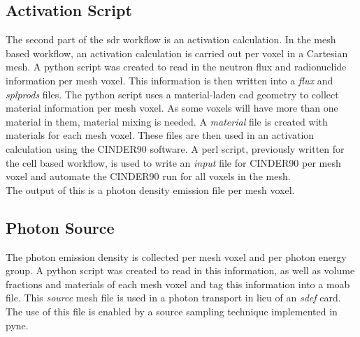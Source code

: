 \subsection{Activation Script}
The second part of the \gls{sdr} workflow is an activation calculation. In the
mesh based workflow, an activation calculation is carried out per voxel in a
Cartesian mesh.
A python script was created to read in the neutron flux and radionuclide
information per mesh voxel. This information is then written into a \emph{flux}
and \emph{splprods} files. The python script uses a material-laden
\gls{cad} geometry to collect material information per mesh voxel. As some
voxels will have more than one material in them, material mixing is needed. A
\emph{material} file is created with materials for each mesh voxel.
These files are then used in an activation calculation using the CINDER90
software. A perl script, previously written for the cell based workflow, is
used to write an \emph{input} file for CINDER90 per mesh voxel and automate
the CINDER90 run for all voxels in the mesh.\\
The output of this is a photon density emission file per mesh voxel.
\subsection{Photon Source}
The photon emission density is collected per mesh voxel and per photon energy
group. A python script was created to read in this information, as well as
volume fractions and materials of each mesh voxel and tag this information
into a \gls{moab} file.
This \emph{source} mesh file is used in a photon transport in lieu of an
\emph{sdef} card. The use of this file is enabled by a source sampling
technique implemented in \gls{pyne}.
\newpage
